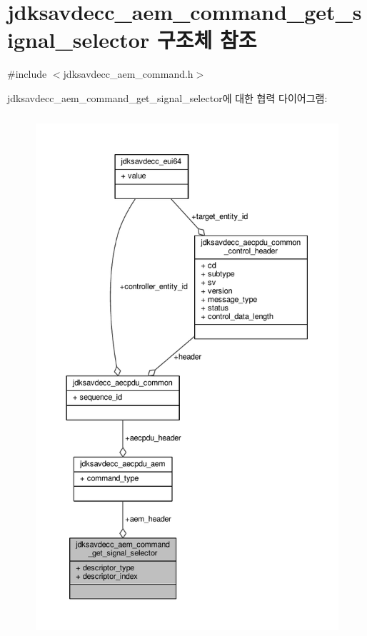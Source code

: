 \hypertarget{structjdksavdecc__aem__command__get__signal__selector}{}\section{jdksavdecc\+\_\+aem\+\_\+command\+\_\+get\+\_\+signal\+\_\+selector 구조체 참조}
\label{structjdksavdecc__aem__command__get__signal__selector}


{\ttfamily \#include $<$jdksavdecc\+\_\+aem\+\_\+command.\+h$>$}



jdksavdecc\+\_\+aem\+\_\+command\+\_\+get\+\_\+signal\+\_\+selector에 대한 협력 다이어그램\+:
\nopagebreak
\begin{figure}[H]
\begin{center}
\leavevmode
\includegraphics[height=550pt]{structjdksavdecc__aem__command__get__signal__selector__coll__graph}
\end{center}
\end{figure}
